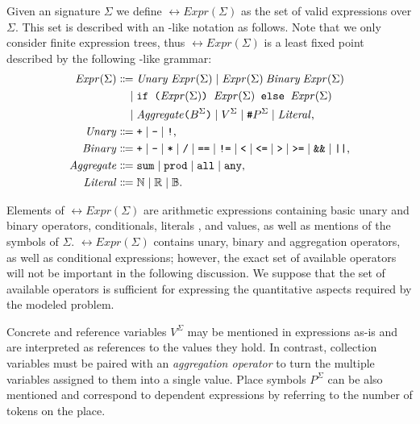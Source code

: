 Given an  signature \(\Sigma\) we define \(\rel{Expr}(\Sigma)\) as the set of valid expressions over \(\Sigma\). This set is described with an -like notation as follows. Note that we only consider finite expression trees, thus \(\rel{Expr}(\Sigma)\) is a least fixed point described by the following -like grammar:
\begin{equation}
  \label{eq:rgspn:expression}
  \begin{aligned}
    \ebnfV{\rel{Expr}(\Sigma)} &\ebnfEq \ebnfVar{Unary}\; \ebnfV{\rel{Expr}(\Sigma)}
    \mid \ebnfV{\rel{Expr}(\Sigma)} \mathbin{\ebnfVar{Binary}} \ebnfV{\rel{Expr}(\Sigma)} \\*
    &\ebnfCont \lit{if (\ebnfV{\rel{Expr}(\Sigma)}) \ebnfV{\rel{Expr}(\Sigma)} else \ebnfV{\rel{Expr}(\Sigma)}} \\*
    &\ebnfCont \ebnfVar{Aggregate} \lit{(} \ebnfV{B^\Sigma} \lit{)} \mid
      \ebnfV{V^\Sigma} \mid \lit{\#} \ebnfV{P^\Sigma} 
      \mid \ebnfVar{Literal} \text, \\
    \ebnfVar{Unary} &\ebnfEq \lit{+} \mid \lit{-} \mid \lit{!} \text, \\
    \ebnfVar{Binary} &\ebnfEq \lit{+} \mid \lit{-} \mid \lit{*} \mid \lit{/}
    \mid \lit{==} \mid \lit{!=} \mid \lit{<} \mid \lit{<=} \mid \lit{>} \mid \lit{>=}
    \mid \lit{\&\&} \mid \lit{||} \text, \\
    \ebnfVar{Aggregate} &\ebnfEq \lit{sum} \mid \lit{prod}
    \mid \lit{all} \mid \lit{any} \text, \\
    \ebnfVar{Literal} &\ebnfEq \ebnfV{\NN} \mid \ebnfV{\RR} \mid \ebnfV{\BB} \text.
  \end{aligned}
\end{equation}

Elements of \(\rel{Expr}(\Sigma)\) are arithmetic expressions containing basic unary and binary operators, conditionals, literals ,  and  values, as well as mentions of the symbols of \(\Sigma\). \(\rel{Expr}(\Sigma)\) contains unary, binary and aggregation operators, as well as conditional expressions; however, the exact set of available operators will not be important in the following discussion. We suppose that the set of available operators is sufficient for expressing the quantitative aspects required by the modeled problem.

Concrete and reference variables \(V^\Sigma\) may be mentioned in expressions as-is and are interpreted as references to the values they hold. In contrast, collection variables must be paired with an \emph{aggregation operator} to turn the multiple variables assigned to them into a single value. Place symbols \(P^\Sigma\) can be also mentioned and correspond to  dependent expressions by referring to the number of tokens on the place.

